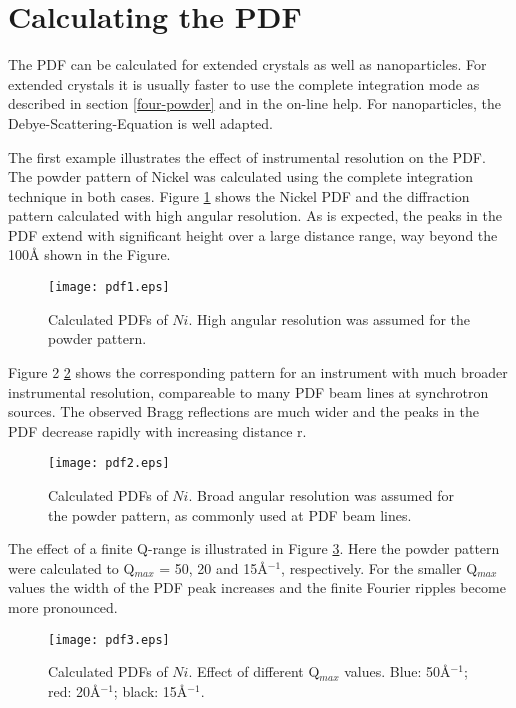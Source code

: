 \section{Calculating the PDF \label{pdf-calc}}

The PDF can be calculated for extended crystals as well as nanoparticles.
For extended crystals it is usually faster to use the complete integration
mode as described in section \ref{four-powder} and in the on-line help.
For nanoparticles, the Debye-Scattering-Equation is well adapted.

The first example illustrates the effect of instrumental resolution on the 
PDF. The powder pattern of Nickel was calculated using the complete integration
technique in both cases. Figure \ref{pdf-fig1} shows the Nickel PDF and 
the diffraction pattern calculated with high angular resolution. As
is expected, the peaks in the PDF extend with significant height over
a large distance range, way beyond the 100\AA{} shown in the Figure.
%
\begin{figure}[!b]
   \centering
   \texttt{[image: pdf1.eps]}
   \vspace*{+20mm}
   \caption{Calculated PDFs of $Ni$. High angular resolution was 
             assumed for the powder pattern.}
   \label{pdf-fig1}
\end{figure}
%
Figure 2 \ref{pdf-fig2} shows the corresponding pattern for an instrument with much 
broader instrumental resolution, compareable to many PDF beam lines
at synchrotron sources. The observed Bragg reflections are much wider 
and the peaks in the PDF decrease rapidly with increasing distance r.
%
\begin{figure}[!b]
   \centering
   \texttt{[image: pdf2.eps]}
   \vspace*{+20mm}
   \caption{Calculated PDFs of $Ni$. Broad angular resolution was 
             assumed for the powder pattern, as commonly used at PDF beam lines.}
   \label{pdf-fig2}
\end{figure}
%
\par
The effect of a finite Q-range is illustrated in Figure \ref{pdf-fig3}. Here 
the powder pattern were calculated to Q$_{max}$ = 50, 20 and 15\AA$^{-1}$, 
respectively. For the smaller Q$_{max}$ values the width of the PDF peak
increases and the finite Fourier ripples become more pronounced.
%
\begin{figure}[!b]
   \centering
   \texttt{[image: pdf3.eps]}
   \vspace*{+20mm}
   \caption{Calculated PDFs of $Ni$. Effect of different Q$_{max}$ values.
             Blue: 50\AA$^{-1}$; red: 20\AA$^{-1}$; black: 15\AA$^{-1}$.}
   \label{pdf-fig3}
\end{figure}
%

